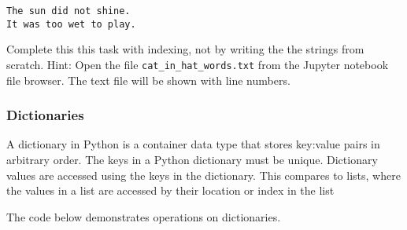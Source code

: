 \documentclass[11pt]{article}
\begin{document}
\begin{verbatim}
The sun did not shine.
It was too wet to play.
\end{verbatim}

Complete this this task with indexing, not by writing the the strings
from scratch. Hint: Open the file \texttt{cat\_in\_hat\_words.txt} from
the Jupyter notebook file browser. The text file will be shown with line
numbers.

    \hypertarget{dictionaries}{%
\subsubsection{Dictionaries}\label{dictionaries}}

A dictionary in Python is a container data type that stores key:value
pairs in arbitrary order. The keys in a Python dictionary must be
unique. Dictionary values are accessed using the keys in the dictionary.
This compares to lists, where the values in a list are accessed by their
location or index in the list

The code below demonstrates operations on dictionaries.
\end{document}
